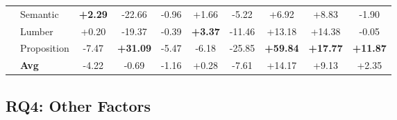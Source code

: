 \begin{table}[htbp]
\begin{tabular}{llcccccccc}
		& Semantic & \cellcolor{lightgreen}\textbf{+2.29} & \cellcolor{lightred}-22.66 & \cellcolor{lightred}-0.96 & \cellcolor{lightgreen}+1.66 & \cellcolor{lightred}-5.22 & \cellcolor{lightgreen}+6.92 & \cellcolor{lightgreen}+8.83 & \cellcolor{lightred}-1.90 \\
		& Lumber & \cellcolor{lightgreen}+0.20 & \cellcolor{lightred}-19.37 & \cellcolor{lightred}-0.39 & \cellcolor{lightgreen}\textbf{+3.37} & \cellcolor{lightred}-11.46 & \cellcolor{lightgreen}+13.18 & \cellcolor{lightgreen}+14.38 & \cellcolor{lightred}-0.05 \\
		& Proposition & \cellcolor{lightred}-7.47 & \cellcolor{lightgreen}\textbf{+31.09} & \cellcolor{lightred}-5.47 & \cellcolor{lightred}-6.18 & \cellcolor{lightred}-25.85 & \cellcolor{lightgreen}\textbf{+59.84} & \cellcolor{lightgreen}\textbf{+17.77} & \cellcolor{lightgreen}\textbf{+11.87} \\
		& \textbf{Avg} & \cellcolor{lightred}-4.22 & \cellcolor{lightred}-0.69 & \cellcolor{lightred}-1.16 & \cellcolor{lightgreen}+0.28 & \cellcolor{lightred}-7.61 & \cellcolor{lightgreen}+14.17 & \cellcolor{lightgreen}+9.13 & \cellcolor{lightgreen}+2.35 \\
		\bottomrule
	\end{tabular}
\end{table}




\subsection{RQ4: Other Factors}

